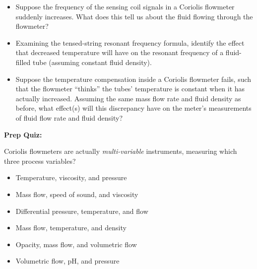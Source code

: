 \begin{itemize}
\item{} Suppose the frequency of the sensing coil signals in a Coriolis flowmeter suddenly increases.  What does this tell us about the fluid flowing through the flowmeter?
\item{} Examining the tensed-string resonant frequency formula, identify the effect that decreased temperature will have on the resonant frequency of a fluid-filled tube (assuming constant fluid density).
\item{} Suppose the temperature compensation inside a Coriolis flowmeter fails, such that the flowmeter ``thinks'' the tubes' temperature is constant when it has actually increased.  Assuming the same mass flow rate and fluid density as before, what effect(s) will this discrepancy have on the meter's measurements of fluid flow rate and fluid density?
\end{itemize}









\vfil \eject

\noindent
{\bf Prep Quiz:}

Coriolis flowmeters are actually {\it multi-variable} instruments, measuring which three process variables?

\begin{itemize}
\item{} Temperature, viscosity, and pressure
\vskip 5pt 
\item{} Mass flow, speed of sound, and viscosity
\vskip 5pt 
\item{} Differential pressure, temperature, and flow
\vskip 5pt 
\item{} Mass flow, temperature, and density
\vskip 5pt 
\item{} Opacity, mass flow, and volumetric flow
\vskip 5pt 
\item{} Volumetric flow, pH, and pressure
\end{itemize}





